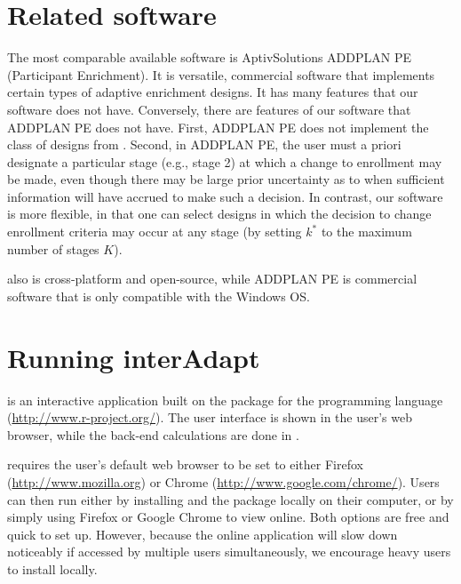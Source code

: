 \documentclass[article]{jss}
\begin{document}
\section{Related software}
\label{ADDPLAN}

The most comparable available software is AptivSolutions ADDPLAN PE (Participant Enrichment). It is versatile, commercial software that implements certain types of adaptive enrichment designs. It has many features that our software does not have. Conversely, there are features of our software that ADDPLAN PE does not have. First, ADDPLAN PE does not implement the class of designs from \citep{Rosenblum2013AdaptMISTIE}. Second, in ADDPLAN PE, the user must a priori designate a particular stage (e.g., stage 2) at which a change to enrollment may be made, even though there may be large prior uncertainty as to when sufficient information will have accrued to make such a decision. In contrast, our software is more flexible, in that one can select designs in which the decision to change enrollment criteria may occur at any stage (by setting $k^*$ to the maximum number of stages $K$).  

 also is cross-platform and open-source, while ADDPLAN PE is commercial software that is only compatible with the Windows OS.

\section{Running interAdapt }%
\label{sec:running-interAdapt}

 is an interactive application built on the  package \citep{shiny2013manual} for the  programming language (\url{http://www.r-project.org/}). The user interface is shown in the user’s web browser, while the back-end calculations are done in . 

 requires the user's default web browser to be set to either Firefox (\url{http://www.mozilla.org}) or Chrome (\url{http://www.google.com/chrome/}). Users can then run  either by installing  and the   package locally on their computer, or by simply using Firefox or Google Chrome to view  online. Both options are free and quick to set up. However, because the online application will slow down noticeably if accessed by multiple users simultaneously, we encourage heavy users to install  locally.
\end{document}
